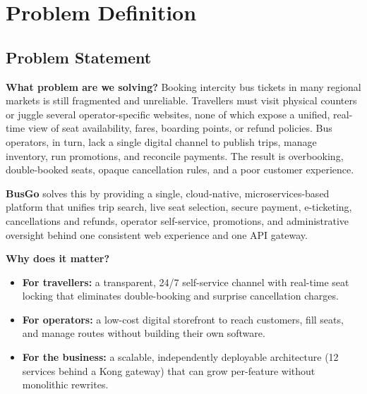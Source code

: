 \documentclass[11pt,a4paper]{article}
\begin{document}
\section{Problem Definition}

\subsection{Problem Statement}
\textbf{What problem are we solving?}
Booking intercity bus tickets in many regional markets is still fragmented and unreliable.
Travellers must visit physical counters or juggle several operator-specific websites, none of
which expose a unified, real-time view of seat availability, fares, boarding points, or refund
policies. Bus operators, in turn, lack a single digital channel to publish trips, manage
inventory, run promotions, and reconcile payments. The result is overbooking, double-booked
seats, opaque cancellation rules, and a poor customer experience.

\medskip
\textbf{BusGo} solves this by providing a single, cloud-native, microservices-based platform
that unifies trip search, live seat selection, secure payment, e-ticketing, cancellations and
refunds, operator self-service, promotions, and administrative oversight behind one consistent
web experience and one API gateway.

\medskip
\textbf{Why does it matter?}
\begin{itemize}[leftmargin=1.4em]
  \item \textbf{For travellers:} a transparent, 24/7 self-service channel with real-time seat
        locking that eliminates double-booking and surprise cancellation charges.
  \item \textbf{For operators:} a low-cost digital storefront to reach customers, fill seats,
        and manage routes without building their own software.
  \item \textbf{For the business:} a scalable, independently deployable architecture (12
        services behind a Kong gateway) that can grow per-feature without monolithic rewrites.
\end{itemize}
\end{document}
